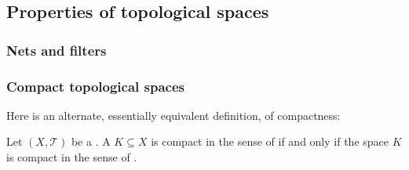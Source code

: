 

\subsection{Properties of topological spaces}


\subsubsection{Nets and filters}



















\subsubsection{Compact topological spaces}


Here is an alternate, essentially equivalent definition, of compactness:

\begin{proposition}
 Let $(X, \mathcal{T})$ be a . A  $K \subseteq X$ is compact in the sense of  if and only if the space $K$ is compact in the sense of .
\end{proposition}

